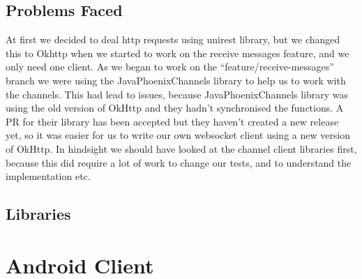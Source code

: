 \documentclass[11pt,a4paper]{report}
\begin{document}
\subsection{Problems Faced}
At first we decided to deal http requests using unirest library, but we changed this to Okhttp when we started to work on the receive messages feature, and we only need one client. As we began to work on the “feature/receive-messages” branch we were using the JavaPhoenixChannels library to help us to work with the channels. This had lead to issues, because JavaPhoenixChannels library was using the old version of OkHttp and they hadn’t synchronised the functions. A PR for their library has been accepted but they haven’t created a new release yet, so it was easier for us to write our own websocket client using a new version of OkHttp. In hindsight we should have looked at the channel client libraries first, because this did require a lot of work to change our tests, and to understand the implementation etc.

\subsection{Libraries}

\section{Android Client}
\end{document}

